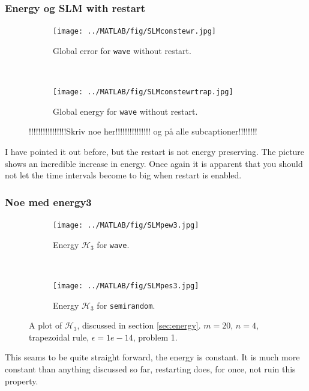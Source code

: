 \subsubsection{Energy og SLM with restart} %
\begin{figure}[H]
        \centering
        \begin{subfigure}[b]{0.45\textwidth}
                \texttt{[image: ../MATLAB/fig/SLMconstewr.jpg]}
                \caption{Global error for \texttt{wave} without restart.}
                \label{fig:SLMconstewr}
        \end{subfigure}
        ~
        \begin{subfigure}[b]{0.45\textwidth}
                \texttt{[image: ../MATLAB/fig/SLMconstewrtrap.jpg]}
                \caption{Global energy for \texttt{wave} without restart.}
                \label{fig:SLMconstesr}
        \end{subfigure}
        \caption{ !!!!!!!!!!!!!!!!Skriv noe her!!!!!!!!!!!!!!! og på alle subcaptioner!!!!!!!!}
        \label{fig:SLMconster}
\end{figure}
I have pointed it out before, but the restart is not energy preserving. The picture shows an incredible increase in energy. Once again it is apparent that you should not let the time intervals become to big when restart is enabled. 
\subsubsection{Noe med energy3}%
\begin{figure}[H]
        \centering
        \begin{subfigure}[b]{0.45\textwidth}
                \texttt{[image: ../MATLAB/fig/SLMpew3.jpg]}
                \caption{Energy $\mathcal{H}_3$ for \texttt{wave}.}
                \label{fig:SLMpew3}
        \end{subfigure}
		~
        \begin{subfigure}[b]{0.45\textwidth}
                \texttt{[image: ../MATLAB/fig/SLMpes3.jpg]}
                \caption{Energy $\mathcal{H}_3$ for \texttt{semirandom}.}
                \label{fig:SLMpes3}
        \end{subfigure}
		
        \caption{A plot of $\mathcal{H}_3$, discussed in section \ref{sec:energy}. $m = 20$, $n= 4$, trapezoidal rule, $\epsilon = 1e-14$, problem 1.}
        \label{fig:SLMpe3}
\end{figure}
This seams to be quite straight forward, the energy is constant. It is much more constant than anything discussed so far, restarting does, for once, not ruin this property. 

